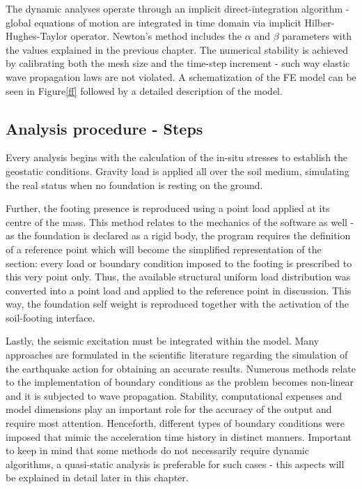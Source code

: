 \documentclass[10pt,a4paper]{report}
\begin{document}
The dynamic analyses operate through an implicit direct-integration algorithm - global equations of motion are integrated in time domain via implicit Hilber-Hughes-Taylor operator. Newton's method includes the $\alpha$ and $\beta$ parameters with the values explained in the previous chapter. The numerical stability is achieved by calibrating both the mesh size and the time-step increment - such way elastic wave propagation laws are not violated. A schematization of the FE model can be seen in Figure\ref{ff} followed by a detailed description of the model.

\subsection{Analysis procedure - Steps}
Every analysis begins with the calculation of the in-situ stresses to establish the geostatic conditions. Gravity load is applied all over the soil medium, simulating the real status when no foundation is resting on the ground. 

Further, the footing presence is reproduced using a point load applied at its centre of the mass. This method relates to the mechanics of the software as well - as the foundation is declared as a rigid body, the program requires the definition of a reference point which will become the simplified representation of the section: every load or boundary condition imposed to the footing is prescribed to this very point only. Thus, the available structural uniform load distribution was converted into a point load and applied to the reference point in discussion. This way, the foundation self weight is reproduced together with the activation of the soil-footing interface. 

Lastly, the seismic excitation must be integrated within the model. Many approaches are formulated in the scientific literature regarding the simulation of the earthquake action for obtaining an accurate results. Numerous methods relate to the implementation of boundary conditions as the problem becomes non-linear and it is subjected to wave propagation. Stability, computational expenses and model dimensions play an important role for the accuracy of the output and require most attention.  Henceforth, different types of boundary conditions were imposed that mimic the acceleration time history in distinct manners. Important to keep in mind that some methods do not necessarily require dynamic algorithms, a quasi-static analysis is preferable for such cases - this aspects will be explained in detail later in this chapter.
\end{document}
